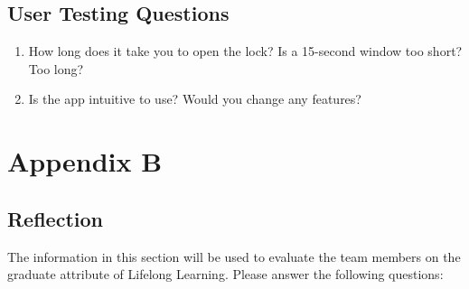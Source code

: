 \documentclass[12pt, titlepage]{article}
\begin{document}
\subsection{User Testing Questions}

\begin{enumerate}
    \item How long does it take you to open the lock? Is a 15-second window too short? Too long?
    \item Is the app intuitive to use? Would you change any features?
\end{enumerate}



\section{Appendix B}
\subsection{Reflection}

The information in this section will be used to evaluate the team members on the
graduate attribute of Lifelong Learning.  Please answer the following questions:
\end{document}
